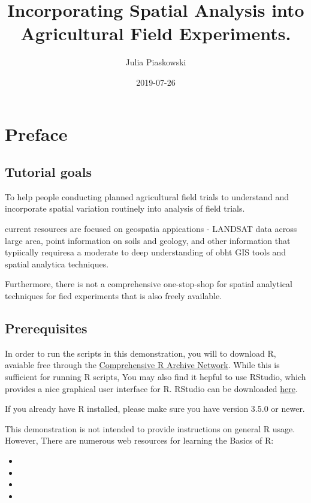 \documentclass[]{book}
\title{Incorporating Spatial Analysis into Agricultural Field Experiments.}
\author{Julia Piaskowski}
\date{2019-07-26}
\begin{document}
\maketitle

{
\setcounter{tocdepth}{1}
\tableofcontents
}
\hypertarget{preface}{%
\chapter{Preface}\label{preface}}

\hypertarget{tutorial-goals}{%
\section{Tutorial goals}\label{tutorial-goals}}

To help people conducting planned agricultural field trials to understand and incorporate spatial variation routinely into analysis of field trials.

current resources are focused on geospatia appications - LANDSAT data across large area, point information on soils and geology, and other information that typiically requiresa a moderate to deep understanding of obht GIS tools and spatial analytica techniques.

Furthermore, there is not a comprehensive one-stop-shop for spatial analytical techniques for fied experiments that is also freely available.

\hypertarget{prerequisites}{%
\section{Prerequisites}\label{prerequisites}}

In order to run the scripts in this demonstration, you will to download R, avaiable free through the \href{}{Comprehensive R Archive Network}. While this is sufficient for running R scripts, You may also find it hepful to use RStudio, which provides a nice graphical user interface for R. RStudio can be downloaded \href{}{here}.

If you already have R installed, please make sure you have version 3.5.0 or newer.

This demonstration is not intended to provide instructions on general R usage. However, There are numerous web resources for learning the Basics of R:

\begin{itemize}
\item
\item
\item
\item
\end{itemize}
\end{document}
